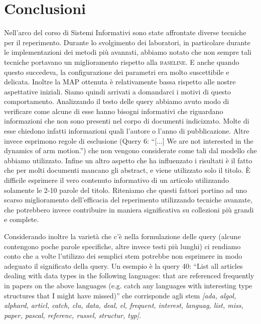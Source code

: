 \documentclass{llncs}
\begin{document}






\section{Conclusioni}
\label{sec:conclusioni}
Nell'arco del corso di Sistemi Informativi sono state affrontate diverse tecniche per il reperimento. Durante lo svolgimento dei laboratori, in particolare durante le implementazioni dei metodi pi\`u avanzati, abbiamo notato che non sempre tali tecniche portavano un miglioramento rispetto alla \textsc{baseline}. E anche quando questo succedeva, la configurazione dei parametri era molto suscettibile e delicata. Inoltre la MAP ottenuta \`e relativamente bassa rispetto alle nostre aspettative iniziali. Siamo quindi arrivati a domandarci i motivi di questo comportamento. Analizzando il testo delle query abbiamo avuto modo di verificare come alcune di esse hanno bisogni informativi che riguardano informazioni che non sono presenti nel corpo di documenti indicizzato. Molte di esse chiedono infatti informazioni quali l'autore o l'anno di pubblicazione. Altre invece esprimono regole di esclusione (Query 6: ``[...] We are not interested in the dynamics of arm motion.'') che non vengono considerate come tali dal modello che abbiamo utilizzato. Infine un altro aspetto che ha influenzato i risultati \`e il fatto che per molti documenti mancano gli abstract, e viene utilizzato solo il titolo. \`E difficile esprimere il vero contenuto informativo di un articolo utilizzando solamente le 2-10 parole del titolo. Riteniamo che questi fattori portino ad uno scarso miglioramento dell'efficacia del reperimento utilizzando tecniche avanzate, che potrebbero invece contribuire in maniera significativa su collezioni pi\`u grandi e complete. 

Considerando inoltre la variet\`a che c'\`e nella formulazione delle query (alcune contengono poche parole specifiche, altre invece testi pi\`u lunghi) ci rendiamo conto che a volte l'utilizzo dei semplici stem potrebbe non esprimere in modo adeguato il significato della query. Un esempio \`e la query 40: ``List all articles dealing with data types in the following languages: that are referenced frequently in papers on the above languages (e.g. catch any languages with interesting type structures that I might have missed)'' che corrisponde agli stem \textit{[ada, algol, alphard, articl, catch, clu, data, deal, el, frequent, interest, languag, list, miss, paper, pascal, referenc, russel, structur, typ]}.
\end{document}
